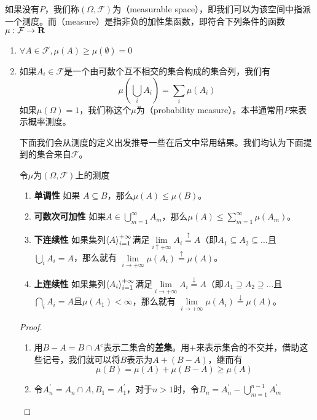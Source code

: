 \documentclass[../main.tex]{subfiles}
\begin{document}
如果没有\(P\)，我们称\((\Omega, \mathcal{F})\)为（measurable space），即我们可以为该空间中指派一个测度。而（measure）是指非负的加性集函数，即符合下列条件的函数\(\mu: \mathcal{F} \rightarrow \mathbf{R}\)
\begin{enumerate}
	\item \(\forall A \in \mathcal{F}, \mu(A) \geq \mu(\emptyset) = 0\)
	\item 如果\(A_i \in \mathcal{F}\)是一个由可数个互不相交的集合构成的集合列，我们有
	\[\mu\left(\bigcup_i A_i\right) = \sum_{i}\mu(A_i)\]
	如果\(\mu(\Omega) = 1\)，我们称这个\(\mu\)为（probability measure）。本书通常用\(P\)来表示概率测度。

	下面我们会从测度的定义出发推导一些在后文中常用结果。我们均认为下面提到的集合来自\(\mathcal{F}\)。
	\begin{theorem} \label{thm:1.1.1}
		令\(\mu\)为\((\Omega, \mathcal{F})\)上的测度
		\begin{enumerate}
			\item \label{prop:measure:monotone} \textbf{单调性} 如果 \(A \subseteq B\)，那么\(\mu(A) \leq \mu(B)\)。
			\item \textbf{可数次可加性}\label{thm:1.1.1.2} 如果\(A \in \bigcup_{m=1}^\infty A_m\)，那么\(\mu(A) \leq \sum_{m=1}^\infty\mu(A_m)\)。
			\item \label{prop:measure:below_continuity} \textbf{下连续性} %
			 如果集列\(\left<A\right>^{+\infty}_{i=1}\)满足\(\lim\limits_{i\uparrow+\infty}A_i \stackrel{\uparrow}{=} A\)（即\(A_1 \subseteq A_2 \subseteq \dots\)且 \(\bigcup_i A_i = A\)，那么就有 \(\lim\limits_{i\rightarrow+\infty}\mu(A_i) \stackrel{\uparrow}{=} \mu(A)\)。
			\item \textbf{上连续性} 如果集列\(\left<A_i\right>^{+\infty}_{i=1}\)满足\(\lim\limits_{i\rightarrow+\infty}A_i \stackrel{\downarrow}{=} A\)（即\(A_1 \supseteq A_2 \supseteq \dots\)且 \(\bigcap_i A_i = A\)且\(\mu(A_1) < \infty\)，那么就有 \(\lim\limits_{i\rightarrow+\infty}\mu(A_i) \stackrel{\downarrow}{=} \mu(A)\)。
		\end{enumerate}
	\end{theorem}
	\begin{proof}
		\begin{enumerate}
			\item 用\(B-A = B\cap A^c\)表示二集合的\textbf{差集}。用\(+\)来表示集合的不交并，借助这些记号，我们就可以将\(B\)表示为\(A+(B-A)\)，继而有
			\[\mu(B) = \mu(A) + \mu(B-A) \geq \mu(A)\]
			\item 令\(A^\prime_n = A_n \cap A, B_1 = A^\prime_1\)，对于\(n > 1\)时，令\(B_n=A^\prime_n - \bigcup_{m=1}^{n-1}A^\prime_m\)

\end{enumerate}
\end{proof}
\end{enumerate}
\end{document}
